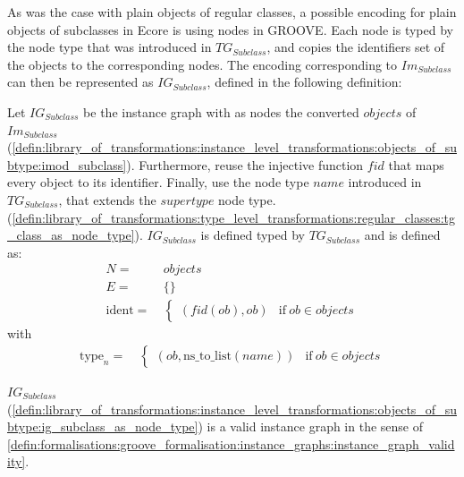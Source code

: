 As was the case with plain objects of regular classes, a possible encoding for plain objects of subclasses in Ecore is using nodes in GROOVE. Each node is typed by the node type that was introduced in $TG_{Subclass}$, and copies the identifiers set of the objects to the corresponding nodes. The encoding corresponding to $Im_{Subclass}$ can then be represented as $IG_{Subclass}$, defined in the following definition:

\begin{defin}
\label{defin:library_of_transformations:instance_level_transformations:objects_of_subtype:ig_subclass_as_node_type}
Let $IG_{Subclass}$ be the instance graph with as nodes the converted $objects$ of $Im_{Subclass}$ (\cref{defin:library_of_transformations:instance_level_transformations:objects_of_subtype:imod_subclass}). Furthermore, reuse the injective function $fid$ that maps every object to its identifier. Finally, use the node type $name$ introduced in $TG_{Subclass}$, that extends the $supertype$ node type. (\cref{defin:library_of_transformations:type_level_transformations:regular_classes:tg_class_as_node_type}). $IG_{Subclass}$ is defined typed by $TG_{Subclass}$ and is defined as:
\begin{align*}
N =\ & objects \\
E =\ & \{\} \\
\mathrm{ident} =\ & \begin{cases}
    (fid(ob), ob) & \mathrm{if }\ ob \in objects
\end{cases}
\end{align*}
with
\begin{align*}
\mathrm{type}_n =\ & \begin{cases}
    (ob, \mathrm{ns\_\!to\_\!list}(name)) & \mathrm{if }\ ob \in objects
\end{cases}
\end{align*}
\end{defin}

\begin{thm}
\label{defin:library_of_transformations:instance_level_transformations:objects_of_subtype:ig_subclass_as_node_type_correct}
$IG_{Subclass}$ (\cref{defin:library_of_transformations:instance_level_transformations:objects_of_subtype:ig_subclass_as_node_type}) is a valid instance graph in the sense of \cref{defin:formalisations:groove_formalisation:instance_graphs:instance_graph_validity}.
\end{thm}

